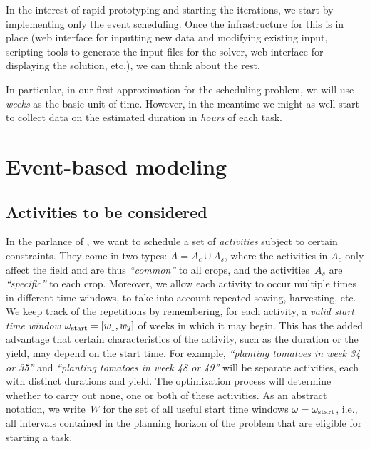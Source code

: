 \documentclass[11pt,reqno]{amsart}
\numberwithin{equation}{section}
\begin{document}
In the interest of rapid prototyping and starting the iterations, we start by implementing
only the event scheduling. Once the infrastructure for this is in place (web interface for
inputting new data and modifying existing input, scripting tools to generate the input
files for the solver, web interface for displaying the solution, etc.), we can think about
the rest.

In particular, in our first approximation for the scheduling problem, we will use
\emph{weeks} as the basic unit of time. However, in the meantime we might as well start to
collect data on the estimated duration in \emph{hours} of each task.


\section{Event-based modeling}


\subsection{Activities to be considered}

In the parlance of \cite{artigues-etal11}, we want to schedule a set
of \emph{activities} subject to certain constraints. 
%
%
They come in two types: $A=A_c\cup A_s$, where the activities in $A_c$ only affect the
field and are thus \emph{``common''} to all crops, and the activities~$A_s$ are
\emph{``specific''} to each crop. Moreover, we allow each activity to occur multiple times
in different time windows, to take into account repeated sowing, harvesting, etc. We keep
track of the repetitions by remembering, for each activity, a \emph{valid start time
  window} $\omega_{\rm start} = [w_1, w_2]$ of weeks in which it may begin. This has the
added advantage that certain characteristics of the activity, such as the duration or the
yield, may depend on the start time. For example, \emph{``planting tomatoes in week 34 or
  35''} and \emph{``planting tomatoes in week 48 or 49''} will be separate activities,
each with distinct durations and yield. The optimization process will determine whether to
carry out none, one or both of these activities. As an abstract notation, we write~$W$ for
the set of all useful start time windows $\omega = \omega_{\rm start}$, i.e., all
intervals contained in the planning horizon of the problem that are eligible for starting
a task.
\end{document}
